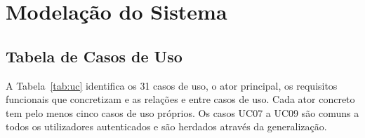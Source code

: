 \chapter{Modelação do Sistema}
\label{cap:modelacao}

\section{Tabela de Casos de Uso}

A Tabela~\ref{tab:uc} identifica os 31 casos de uso, o ator principal, os
requisitos funcionais que concretizam e as relações
\incl{} e \extd{} entre casos de uso. Cada ator concreto tem pelo menos cinco
casos de uso próprios. Os casos UC07 a UC09 são comuns a todos os
utilizadores autenticados e são herdados através da generalização.

